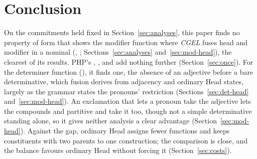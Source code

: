 %

\section{Conclusion}\label{sec:conclusion}

On the commitments held fixed in Section~\ref{sec:analyses}, this paper finds no property of form that shows the modifier function where \textit{CGEL} fuses head and modifier in a nominal (, ; Sections~\ref{sec:analyses} and~\ref{sec:mod-head}), the clearest of its results. PHP's , , and  add nothing further (Section~\ref{sec:once}). For the determiner function (), it finds one, the absence of an adjective before a bare determinative, which fusion derives from adjacency and ordinary Head states, largely as the grammar states the pronouns' restriction (Sections~\ref{sec:det-head} and~\ref{sec:mod-head}). An exclamation that lets a pronoun take the adjective lets the compounds and partitive  and  take it too, though not a simple determinative standing alone, so it gives neither analysis a clear advantage (Section~\ref{sec:mod-head}). Against the gap, ordinary Head assigns fewer functions and keeps constituents with two parents to one construction; the comparison is close, and the balance favours ordinary Head without forcing it (Section~\ref{sec:costs}).

